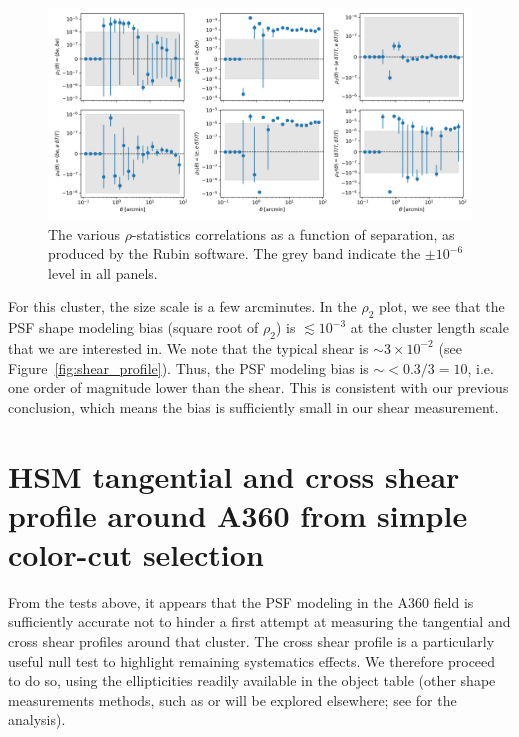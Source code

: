 \documentclass[SE,lsstdraft,authoryear,toc]{lsstdoc}
\begin{document}
\begin{figure}
\centering
\includegraphics[width=\textwidth]{Figures/rho_stat.png}
\caption{The various $\rho$-statistics correlations as a function of separation, as produced by the Rubin  software. The grey band indicate the $\pm 10^{-6}$ level in all panels.\label{fig:rho_stat}}
\end{figure}


For this cluster, the size scale is a few arcminutes. In the $\rho_2$ plot, we see that the PSF shape modeling bias (square root of $\rho_2$) is $\lesssim 10^{-3}$ at the cluster length scale that we are interested in. We note that the typical shear is $\sim 3\times10^{-2}$ (see Figure~\ref{fig:shear_profile}). Thus, the PSF modeling bias is $\sim <0.3/3=10$, i.e. one order of magnitude lower than the shear. This is consistent with our previous conclusion, which means the bias is sufficiently small in our shear measurement.


\section{HSM tangential and cross shear profile around A360 from simple color-cut selection}
\label{sec:shear_profile}

From the tests above, it appears that the PSF modeling in the A360 field is sufficiently accurate not to hinder a first attempt at measuring the tangential and cross shear profiles around that cluster. The cross shear profile is a particularly useful null test to highlight remaining systematics effects. We therefore proceed to do so, using the  ellipticities readily available in the object table (other shape measurements methods, such as  or  will be explored elsewhere; see \citet{SITCOMTN-162} for the  analysis). 
\end{document}
